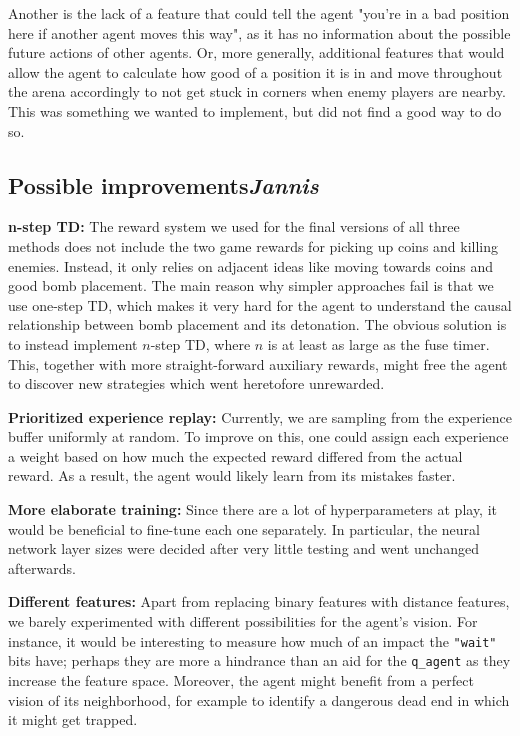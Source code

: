 \documentclass{article}
\begin{document}
Another is the lack of a feature that could tell the agent "you're in a bad position here if another agent moves this way", as it has no information about the possible future actions of other agents.
Or, more generally, additional features that would allow the agent to calculate how good of a position it is in and move throughout the arena accordingly to not get stuck in corners when enemy players are nearby.
This was something we wanted to implement, but did not find a good way to do so.

\subsection[Possible improvements]{Possible improvements{\normalsize \normalfont \it \hfill Jannis}}

\textbf{n-step TD:} The reward system we used for the final versions of all three methods does not include the two game rewards for picking up coins and killing enemies. Instead, it only relies on adjacent ideas like moving towards coins and good bomb placement. The main reason why simpler approaches fail is that we use one-step TD, which makes it very hard for the agent to understand the causal relationship between bomb placement and its detonation. The obvious solution is to instead implement $n$-step TD, where $n$ is at least as large as the fuse timer. This, together with more straight-forward auxiliary rewards, might free the agent to discover new strategies which went heretofore unrewarded.

\textbf{Prioritized experience replay:} Currently, we are sampling from the experience buffer uniformly at random. To improve on this, one could assign each experience a weight based on how much the expected reward differed from the actual reward. As a result, the agent would likely learn from its mistakes faster.

\textbf{More elaborate training:} Since there are a lot of hyperparameters at play, it would be beneficial to fine-tune each one separately. In particular, the neural network layer sizes were decided after very little testing and went unchanged afterwards.

\textbf{Different features:} Apart from replacing binary features with distance features, we barely experimented with different possibilities for the agent's vision. For instance, it would be interesting to measure how much of an impact the \texttt{"wait"} bits have; perhaps they are more a hindrance than an aid for the \texttt{q\_agent} as they increase the feature space. Moreover, the agent might benefit from a perfect vision of its neighborhood, for example to identify a dangerous dead end in which it might get trapped.
\end{document}
